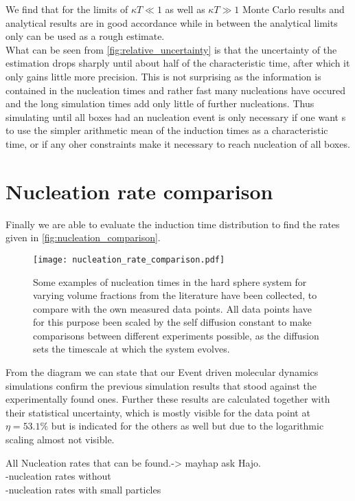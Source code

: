 We find that for the limits of $\kappa T \ll 1$ as well as $\kappa T \gg 1$ Monte Carlo results and analytical results are in good accordance while in between the analytical limits only can be used as a rough estimate.\\

What can be seen from \autoref{fig:relative_uncertainty} is that the uncertainty of the estimation drops sharply until about half of the characteristic time, after which it only gains little more precision. This is not surprising as the information is contained in the nucleation times and rather fast many nucleations have occured and the long simulation times add only little of further nucleations. Thus simulating until all boxes had an nucleation event is only necessary if one want s to use the simpler arithmetic mean of the induction times as a characteristic time, or if any oher constraints make it necessary to reach nucleation of all boxes.

\section{Nucleation rate comparison}
\label{sec:nucleation_rates}
Finally we are able to evaluate the induction time distribution to find the rates given in \autoref{fig:nucleation_comparison}.

\begin{figure}[h]
\centering
\texttt{[image: nucleation\_rate\_comparison.pdf]}
\caption{Some examples of nucleation times in the hard sphere system for varying volume fractions from the literature have been collected, to compare with the own measured data points. All data points have for this purpose been scaled by the self diffusion constant to make comparisons between different experiments possible, as the diffusion sets the timescale at which the system evolves.}
\label{fig:nucleation_comparison}
\end{figure}

From the diagram we can state that our Event driven molecular dynamics simulations confirm the previous simulation results that stood against the experimentally found ones. Further these results are calculated together with their statistical uncertainty, which is mostly visible for the data point at $\eta = 53.1 \%$ but is indicated for the others as well but due to the logarithmic scaling almost not visible.

All Nucleation rates that can be found.-> mayhap ask Hajo.\\
-nucleation rates without\\
-nucleation rates with small particles\\


